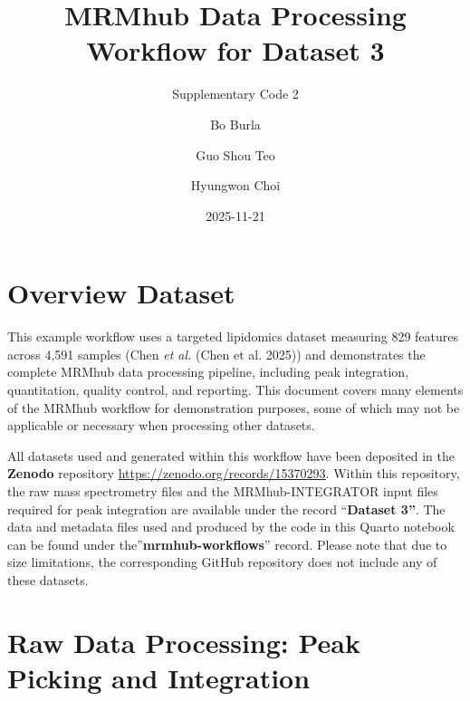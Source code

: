\documentclass[
  letterpaper,
  DIV=11,
  numbers=noendperiod]{scrartcl}
\title{MRMhub Data Processing Workflow for Dataset 3}
\subtitle{Supplementary Code 2}
\author{Bo Burla \and Guo Shou Teo \and Hyungwon Choi}
\date{2025-11-21}
\renewcommand*\contentsname{Table of contents}
\newcommand\contentsname{Table of contents}
\begin{document}
\maketitle

\renewcommand*\contentsname{Table of contents}
{
\hypersetup{linkcolor=}
\setcounter{tocdepth}{3}
\tableofcontents
}

\newpage

\section{Overview Dataset}\label{overview-dataset}

This example workflow uses a targeted lipidomics dataset measuring 829
features across 4,591 samples (Chen \emph{et al.} (Chen et al. 2025))
and demonstrates the complete MRMhub data processing pipeline, including
peak integration, quantitation, quality control, and reporting. This
document covers many elements of the MRMhub workflow for demonstration
purposes, some of which may not be applicable or necessary when
processing other datasets.

\begin{tcolorbox}[enhanced jigsaw, opacityback=0, titlerule=0mm, arc=.35mm, rightrule=.15mm, left=2mm, colbacktitle=quarto-callout-important-color!10!white, leftrule=.75mm, toprule=.15mm, bottomtitle=1mm, toptitle=1mm, title=\textcolor{quarto-callout-important-color}{\faExclamation}\hspace{0.5em}{Important}, colframe=quarto-callout-important-color-frame, opacitybacktitle=0.6, breakable, bottomrule=.15mm, colback=white, coltitle=black]

All datasets used and generated within this workflow have been deposited
in the \textbf{Zenodo} repository
\url{https://zenodo.org/records/15370293}. Within this repository, the
raw mass spectrometry files and the MRMhub-INTEGRATOR input files
required for peak integration are available under the record
``\textbf{Dataset 3''}. The data and metadata files used and produced by
the code in this Quarto notebook can be found under
the''\textbf{mrmhub-workflows}'' record. Please note that due to size
limitations, the corresponding GitHub repository does not include any of
these datasets.

\end{tcolorbox}

\section{Raw Data Processing: Peak Picking and
Integration}\label{raw-data-processing-peak-picking-and-integration}
\end{document}
